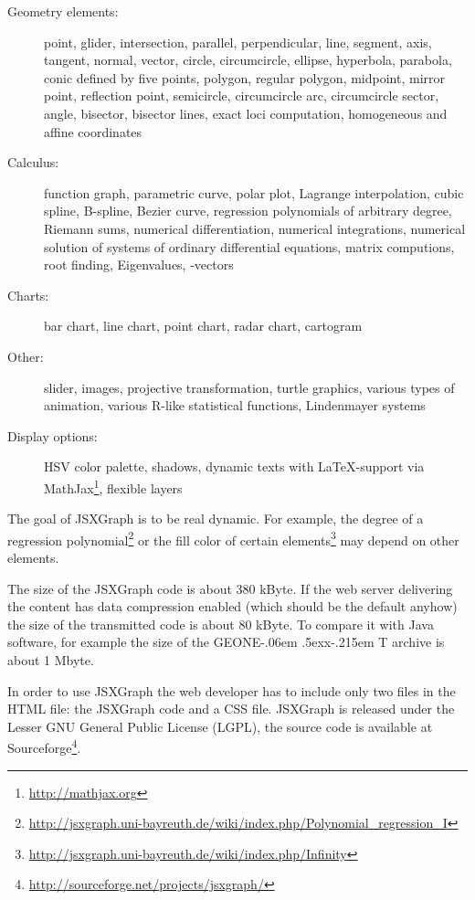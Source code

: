\documentclass[12pt,a4paper]{article}%
\def\GEONExT{GEONE\kern-.06em \lower.5ex\hbox{x}\kern-.215em T}
\begin{document}
\begin{description}
\item[Geometry elements:]
point, glider, intersection, parallel, perpendicular,
line, segment, axis, tangent, normal, vector,
circle, circumcircle, ellipse, hyperbola, parabola, conic defined by five points,
polygon, regular polygon, 
midpoint, mirror point, reflection point, 
semicircle, circumcircle arc, circumcircle sector,
angle, bisector, bisector lines,
exact loci computation, homogeneous and affine coordinates
\item[Calculus:]
function graph, parametric curve, polar plot, 
Lagrange interpolation, cubic spline, B-spline, Bezier curve,
regression polynomials of arbitrary degree, 
Riemann sums, 
numerical differentiation, numerical integrations,
numerical solution of systems of ordinary differential equations,
matrix computions, root finding,
Eigenvalues, -vectors
\item[Charts:]
bar chart, line chart, point chart, radar chart, cartogram
\item[Other:]
slider, images, 
projective transformation, turtle graphics, various types of animation,
various R-like statistical functions, Lindenmayer systems
\item[Display options:]
HSV color palette, shadows, dynamic texts with \LaTeX{}-support 
via MathJax\footnote{\href{http://mathjax.org}{http://mathjax.org}}, 
flexible layers
\end{description}
The goal of JSXGraph is to be real dynamic. For example, 
the degree of a regression 
polynomial\footnote{\href{http://jsxgraph.uni-bayreuth.de/wiki/index.php/Polynomial_regression_I}{http://jsxgraph.uni-bayreuth.de/wiki/index.php/Polynomial\_regression\_I}} 
or the fill color of certain 
elements\footnote{\href{http://jsxgraph.uni-bayreuth.de/wiki/index.php/Infinity}{http://jsxgraph.uni-bayreuth.de/wiki/index.php/Infinity}} 
may depend on other elements.

The  size 
of the JSXGraph code is about 380 kByte. If the web server delivering the 
content has data compression enabled (which should be the default anyhow) the 
size of the transmitted code is about 80 kByte. To compare it with Java software, 
for example the size of the \GEONExT{} archive is about 1 Mbyte. 

In order to use JSXGraph 
the web developer has to include only two files in the 
HTML file: the JSXGraph code and a CSS file. 
JSXGraph 
is released under the Lesser GNU General Public License (LGPL), the source code
is available at Sourceforge\footnote{\href{http://sourceforge.net/projects/jsxgraph/}{http://sourceforge.net/projects/jsxgraph/}}.
\end{document}
